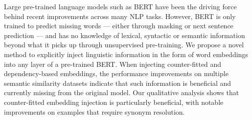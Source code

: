 Large pre-trained language models such as BERT have been the driving force behind recent improvements across many NLP tasks. However, BERT is only trained to predict missing words --- either through masking or next sentence prediction --- and has no knowledge of lexical, syntactic or semantic information beyond what it picks up through unsupervised pre-training. We propose a novel method to explicitly inject linguistic information in the form of word embeddings into any layer of a pre-trained BERT. When injecting counter-fitted and dependency-based embeddings, the performance improvements on multiple semantic similarity datasets indicate that such information is beneficial and currently missing from the original model. Our qualitative analysis shows that counter-fitted embedding injection is particularly beneficial, with notable improvements on examples that require synonym resolution.
